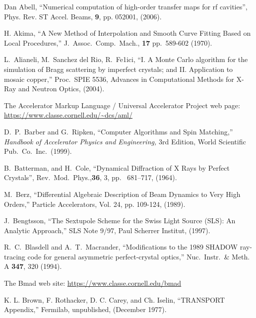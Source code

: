 \begin{thebibliography}{XXXXXXX99}

Dan Abell, ``Numerical computation of high-order transfer maps for rf cavities'',
Phys. Rev. ST Accel. Beams, {\bf 9}, pp. 052001, (2006).

H. Akima, 
``A New Method of Interpolation and Smooth Curve Fitting Based on Local Procedures,'' 
J.\ Assoc.\ Comp.\ Mach., {\bf 17} pp.~589-602 (1970).

L.~Alianeli, M.~Sanchez del Rio, R.~Fe1ici,
``I. A Monte Carlo algorithm for the simulation of Bragg scattering by imperfect crystals; 
and II. Application to mosaic copper,''
Proc.~SPIE 5536, Advances in Computational Methods for X-Ray and Neutron Optics, (2004).

The Accelerator Markup Language / Universal Accelerator Project web page:
\hfill\break
\hspace*{0.3in}
\url{https://www.classe.cornell.edu/~dcs/aml/}

D.~P.~Barber and G.~Ripken,
``Computer Algorithms and Spin Matching,''
{\it Handbook of Accelerator Physics and Engineering,}
3rd Edition, World Scientific Pub.\ Co.\ Inc.\ (1999).

B.~Batterman, and H.~Cole,
``Dynamical Diffraction of X Rays by Perfect Crystals'',
Rev.\ Mod.\ Phys.,{\bf 36}, 3, pp.~ 681--717, (1964).

M.~Berz, 
``Differential Algebraic Description of Beam Dynamics to Very High Orders,''
Particle Accelerators, Vol. 24, pp. 109-124, (1989).

J.~Bengtsson,
``The Sextupole Scheme for the Swiss Light Source (SLS): An Analytic Approach,''
SLS Note 9/97, Paul Scherrer Institut, (1997).

R.~C.~Blasdell and A.~T.~Macrander, 
``Modifications to the 1989 SHADOW ray-tracing code for general asymmetric perfect-crystal optics,''
Nuc.\ Instr.\ \& Meth. A {\bf 347}, 320 (1994).

The Bmad web site:
\hfill\break
\hspace*{0.3in} \url{https://www.classe.cornell.edu/bmad}

K. L. Brown, F. Rothacker, D. C. Carey, and Ch. Iselin, 
``TRANSPORT Appendix,'' 
Fermilab, unpublished, (December 1977).


\end{thebibliography}
